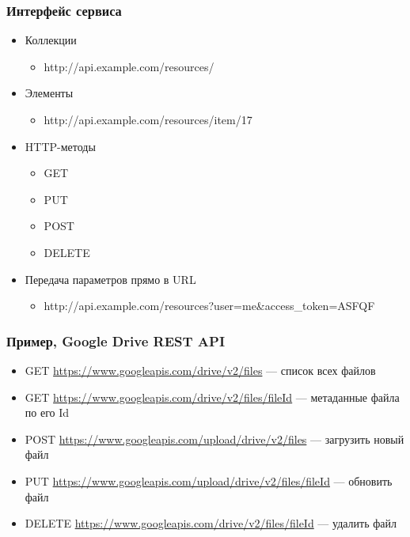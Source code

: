 \documentclass{../../slides-style}
\begin{document}
    \begin{frame}
        \frametitle{Интерфейс сервиса}
        \begin{itemize}
            \item Коллекции
            \begin{itemize}
                \item http://api.example.com/resources/
            \end{itemize}
            \item Элементы
            \begin{itemize}
                \item http://api.example.com/resources/item/17
            \end{itemize}
            \item HTTP-методы
            \begin{itemize}
                \item GET
                \item PUT
                \item POST
                \item DELETE
            \end{itemize}
            \item Передача параметров прямо в URL
            \begin{itemize}
                \item http://api.example.com/resources?user=me\&access\_token=ASFQF
            \end{itemize}
        \end{itemize}
    \end{frame}

    \begin{frame}
        \frametitle{Пример, Google Drive REST API}
        \begin{itemize}
            \item GET \url{https://www.googleapis.com/drive/v2/files} --- список всех файлов
            \item GET \url{https://www.googleapis.com/drive/v2/files/fileId} --- метаданные файла по его Id
            \item POST \url{https://www.googleapis.com/upload/drive/v2/files} — загрузить новый файл
            \item PUT \url{https://www.googleapis.com/upload/drive/v2/files/fileId} --- обновить файл
            \item DELETE \url{https://www.googleapis.com/drive/v2/files/fileId} --- удалить файл
        \end{itemize}
    \end{frame}
\end{document}

